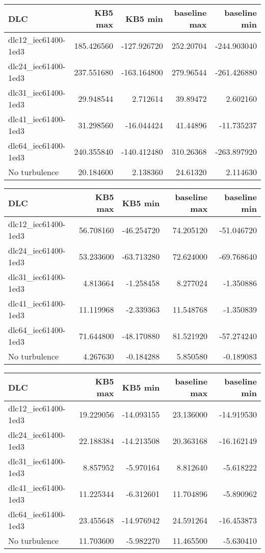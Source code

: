 \begin{tabular}{lrrrr}
\toprule
                 DLC &     KB5 max &     KB5 min &  baseline max &  baseline min \\
\midrule
 dlc12\_iec61400-1ed3 &  185.426560 & -127.926720 &     252.20704 &   -244.903040 \\
 dlc24\_iec61400-1ed3 &  237.551680 & -163.164800 &     279.96544 &   -261.426880 \\
 dlc31\_iec61400-1ed3 &   29.948544 &    2.712614 &      39.89472 &      2.602160 \\
 dlc41\_iec61400-1ed3 &   31.298560 &  -16.044424 &      41.44896 &    -11.735237 \\
 dlc64\_iec61400-1ed3 &  240.355840 & -140.412480 &     310.26368 &   -263.897920 \\
        No turbulence &   20.184600 &    2.138360 &      24.61320 &      2.114630 \\
\bottomrule
\end{tabular}




\begin{tabular}{lrrrr}
\toprule
                 DLC &    KB5 max &    KB5 min &  baseline max &  baseline min \\
\midrule
 dlc12\_iec61400-1ed3 &  56.708160 & -46.254720 &     74.205120 &    -51.046720 \\
 dlc24\_iec61400-1ed3 &  53.233600 & -63.713280 &     72.624000 &    -69.768640 \\
 dlc31\_iec61400-1ed3 &   4.813664 &  -1.258458 &      8.277024 &     -1.350886 \\
 dlc41\_iec61400-1ed3 &  11.119968 &  -2.339363 &     11.548768 &     -1.350839 \\
 dlc64\_iec61400-1ed3 &  71.644800 & -48.170880 &     81.521920 &    -57.274240 \\
        No turbulence &   4.267630 &  -0.184288 &      5.850580 &     -0.189083 \\
\bottomrule
\end{tabular}


\begin{tabular}{lrrrr}
\toprule
                 DLC &    KB5 max &    KB5 min &  baseline max &  baseline min \\
\midrule
 dlc12\_iec61400-1ed3 &  19.229056 & -14.093155 &     23.136000 &    -14.919530 \\
 dlc24\_iec61400-1ed3 &  22.188384 & -14.213508 &     20.363168 &    -16.162149 \\
 dlc31\_iec61400-1ed3 &   8.857952 &  -5.970164 &      8.812640 &     -5.618222 \\
 dlc41\_iec61400-1ed3 &  11.225344 &  -6.312601 &     11.704896 &     -5.890962 \\
 dlc64\_iec61400-1ed3 &  23.455648 & -14.976942 &     24.591264 &    -16.453873 \\
        No turbulence &  11.703600 &  -5.982270 &     11.465500 &     -5.630410 \\
\bottomrule
\end{tabular}


